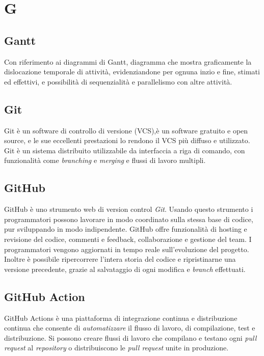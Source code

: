 \chapter{G}

\section{Gantt}
Con riferimento ai diagrammi di Gantt, diagramma che mostra graficamente la dislocazione temporale di attività, evidenziandone per ognuna inzio e fine, stimati ed effettivi, e possibilità di sequenzialità e parallelismo con altre attività.

\section{Git}
Git è un software di controllo di versione (VCS),è un software gratuito e open source, e le sue eccellenti prestazioni lo rendono il VCS più diffuso e utilizzato.
Git è un sistema distribuito utilizzabile da interfaccia a riga di comando, con funzionalità come \emph{branching} e \emph{merging} e flussi di lavoro multipli.

\section{GitHub}
GitHub è uno strumento web di version control \emph{Git}. Usando questo strumento i programmatori possono lavorare in modo coordinato sulla stessa base di codice, pur sviluppando in modo indipendente.
GitHub offre funzionalità di hosting e revisione del codice, commenti e feedback, collaborazione e gestione del team. I programmatori vengono aggiornati in tempo reale sull'evoluzione del progetto. Inoltre è possibile ripercorrere l'intera storia del codice e ripristinarne una versione precedente, grazie al salvataggio di ogni modifica e \emph{branch} effettuati.

\section{GitHub Action}\label{sec:GitHub Actions}
GitHub Actions è una piattaforma di integrazione continua e distribuzione continua che consente di \emph{automatizzare} il flusso di lavoro, di compilazione, test e distribuzione. Si possono creare flussi di lavoro che compilano e testano ogni \emph{pull request} al \emph{repository} o distribuiscono le \emph{pull request} unite in produzione.

